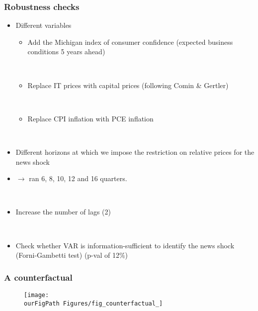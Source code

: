 \documentclass{beamer}
\def \ourFigPath {../../}
\begin{document}
\begin{frame}
	\frametitle{Robustness checks}

\begin{itemize}
\item Different variables
	\begin{itemize}
	\item Add the Michigan index of consumer confidence (expected business conditions 5 years ahead)
	
	
	\
	
	\item Replace IT prices with capital prices (following Comin \& Gertler)
	
	\
	
	\item Replace CPI inflation with PCE inflation
	\end{itemize}
	
	\
	
\item Different horizons at which we impose the restriction on relative prices for the news shock
\item[] $\rightarrow$ ran  6, 8, 10, 12 and 16 quarters.

\

\item Increase the number of lags (2)

\

\item Check whether VAR is information-sufficient to identify the news shock (Forni-Gambetti test) (p-val of 12\%)
\end{itemize}
   		 	
\end{frame}

\begin{frame}
	\frametitle{A counterfactual} 

	\begin{figure}
		\centering
		\texttt{[image: \\ourFigPath Figures/fig\_counterfactual\_]}
	\end{figure}

	

   		 	
\end{frame}
\end{document}

